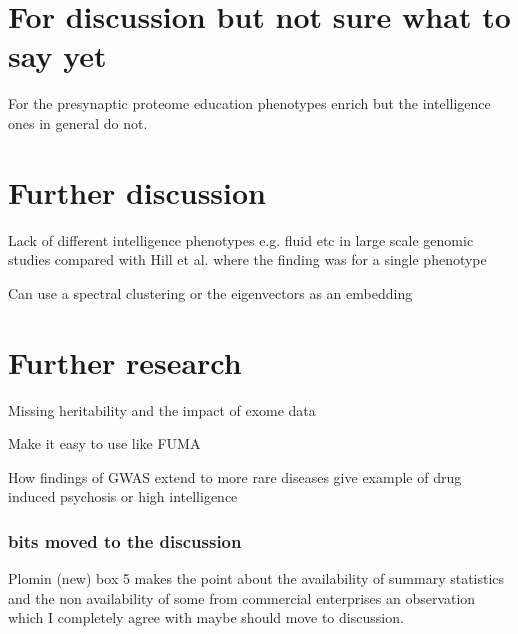 \section{For discussion but not sure what to say yet}

For the presynaptic proteome education phenotypes enrich but the intelligence ones in general do not. 

\section{Further discussion}
Lack of different intelligence phenotypes e.g. fluid etc in large scale genomic studies compared with Hill et al. where the finding was for a single phenotype

Can use a spectral clustering or the eigenvectors as an embedding
\section{Further research}
Missing heritability and the impact of exome data

Make it easy to use like FUMA

How findings of GWAS extend to more rare diseases give example of drug induced psychosis or high intelligence

\subsubsection{bits moved to the discussion}
Plomin (new) \cite{plomin2018new} box 5 makes the point about the availability of summary statistics and the non availability of some from commercial enterprises an observation which I completely agree with maybe should move to discussion.
